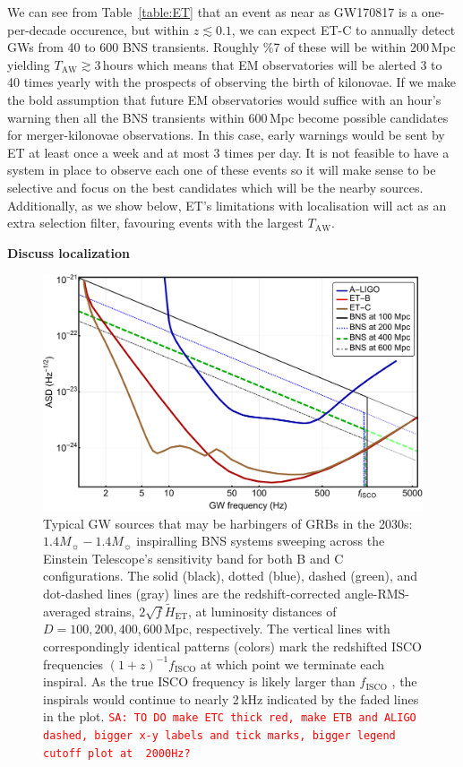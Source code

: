 \documentclass{aa}
\newcommand{\sa}[1]{{\textcolor{red}{\texttt{SA: #1}} }}
\begin{document}
We can see from Table~\ref{table:ET} that an event as near as GW170817 is a one-per-decade occurence,
but within $z\lesssim 0.1$, we can expect ET-C to annually detect GWs from 40 to 600 BNS transients.
Roughly \%7 of these will be within 200\,Mpc yielding $T_\text{AW}\gtrsim 3\,$hours which means that EM observatories will be alerted 3 to 40 times yearly with the prospects of observing the birth of kilonovae.
If we make the bold assumption that future EM observatories would suffice with an hour's warning then
all the BNS transients within 600\,Mpc become possible candidates for merger-kilonovae observations.
In this case, early warnings would be sent by ET at least once a week and at most 3 times per day.
It is not feasible to have a system in place to observe each one of these events
so it will make sense to be selective and focus on the best candidates which will be the nearby sources.
Additionally, as we show below, ET's limitations with localisation will act as an extra selection filter, favouring events with the largest $T_\text{AW}$.

{\bf Discuss localization}


\begin{figure}[t!]
\includegraphics[width=\linewidth]{../Figs/ET_strains_redshifted.pdf}
\caption{Typical GW sources that may be harbingers of GRBs in the 2030s: $1.4 M_\sun-1.4 M_\sun$ inspiralling BNS systems sweeping across 
the Einstein Telescope's sensitivity band for both B and C configurations.
The solid (black), dotted (blue), dashed (green), and dot-dashed lines (gray) lines are the redshift-corrected
angle-RMS-averaged strains, $2\sqrt{f}\tilde{H}_\text{ET}$, at luminosity distances of $D=100, 200, 400, 600\,$Mpc, respectively. 
The vertical lines with correspondingly identical patterns (colors) mark the redshifted ISCO frequencies $(1+z)^{-1} f_\text{ISCO}$ at which point we terminate each inspiral.
As the true ISCO frequency is likely larger than $f_\text{ISCO}$ \citep{Marronetti:2003hx}, the inspirals would continue to nearly 2\,kHz indicated by the faded lines in the plot. %
\sa{TO DO make ETC thick red, make ETB and ALIGO dashed, bigger x-y labels and tick marks, bigger legend cutoff plot at ~2000Hz?}
}
\label{fig:ETB2030}
\end{figure}
\end{document}
